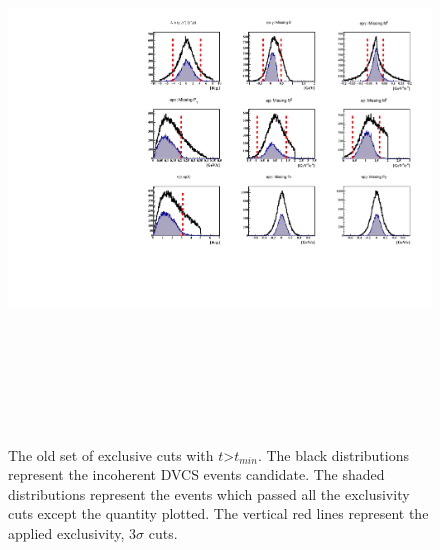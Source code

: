 \documentclass[a4paper,11pt,twoside]{article}
\begin{document}
\begin{figure}[h!]
\includegraphics[height=15.0cm]{fig/old_all_incoh_exc_cuts.pdf}
\caption{The old set of exclusive cuts with $t$>$t_{min}$. The black
   distributions represent the incoherent DVCS events candidate. The shaded
   distributions represent the events which passed all the exclusivity cuts
   except the quantity plotted. The vertical red lines represent the applied
exclusivity, 3$\sigma$ cuts.}
\label{fig:cuts_t}
\end{figure}
\end{document}
